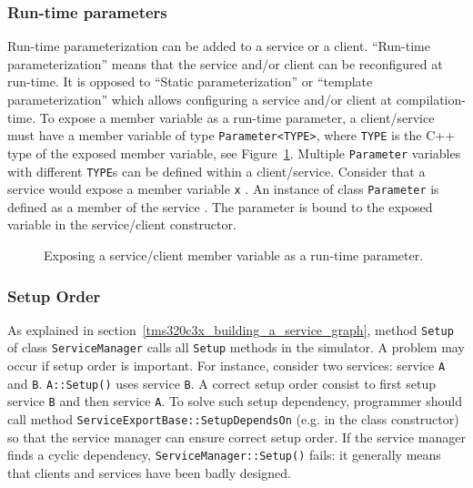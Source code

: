 \subsubsection{Run-time parameters}

Run-time parameterization can be added to a service or a client.
``Run-time parameterization'' means that the service and/or client can be reconfigured at run-time.
It is opposed to ``Static parameterization'' or ``template parameterization'' which allows configuring a service and/or client at compilation-time.
To expose a member variable as a run-time parameter, a client/service must have a member variable of type \texttt{Parameter<TYPE>}, where \texttt{TYPE} is the C++ type of the exposed member variable, see Figure~\ref{fig:tms320c3x_run_time_parameter}.
Multiple \texttt{Parameter} variables with different \texttt{TYPE}s can be defined within a client/service.
Consider that a service would expose a member variable \texttt{x} .
An instance of class \texttt{Parameter} is defined as a member of the service . 
The parameter is bound to the exposed variable  in the service/client constructor.

\begin{figure}[h]
  \begin{center}
    
    \caption{\label{fig:tms320c3x_run_time_parameter} Exposing a service/client member variable as a run-time parameter.}
  \end{center}
\end{figure}

\subsubsection{Setup Order}

As explained in section~\ref{tms320c3x_building_a_service_graph}, method \texttt{Setup} of class \texttt{ServiceManager} calls all \texttt{Setup} methods in the simulator. 
A problem may occur if setup order is important.
For instance, consider two services: service \texttt{A} and \texttt{B}. 
\texttt{A::Setup()} uses service \texttt{B}.
A correct setup order consist to first setup service \texttt{B} and then service \texttt{A}.
To solve such setup dependency, programmer should call method \texttt{ServiceExportBase::SetupDependsOn} (e.g. in the class constructor) so that the service manager can ensure correct setup order.
If the service manager finds a cyclic dependency, \texttt{ServiceManager::Setup()} fails: it generally means that clients and services have been badly designed.

